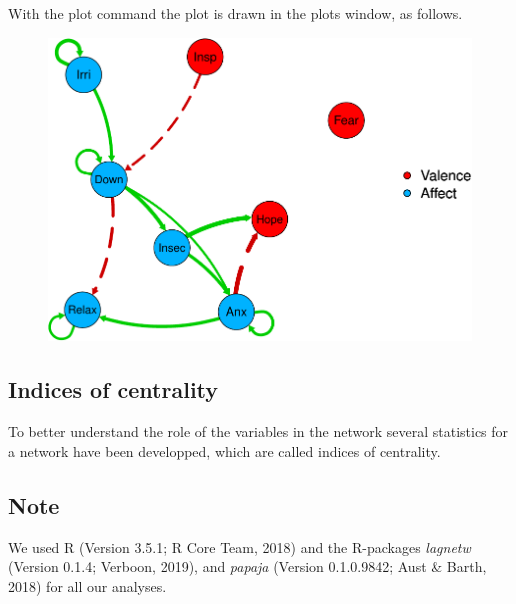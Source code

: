 \documentclass[man,floatsintext]{apa6}
\newenvironment{Shaded}{\begin{snugshade}}{\end{snugshade}}
\newcommand{\KeywordTok}[1]{\textcolor[rgb]{0.13,0.29,0.53}{\textbf{#1}}}
\newcommand{\OperatorTok}[1]{\textcolor[rgb]{0.81,0.36,0.00}{\textbf{#1}}}
\newcommand{\NormalTok}[1]{#1}
\begin{document}
With the plot command the plot is drawn in the plots window, as follows.

\begin{Shaded}
\end{Shaded}

\begin{figure}
\centering
\includegraphics{networkTutorial_files/figure-latex/example1plot-1.pdf}
\caption{}
\end{figure}

\subsection{Indices of centrality}\label{indices-of-centrality}

To better understand the role of the variables in the network several
statistics for a network have been developped, which are called indices
of centrality.

\subsection{Note}\label{note}

We used R (Version 3.5.1; R Core Team, 2018) and the R-packages
\emph{lagnetw} (Version 0.1.4; Verboon, 2019), and \emph{papaja}
(Version 0.1.0.9842; Aust \& Barth, 2018) for all our analyses.

\newpage
\end{document}
